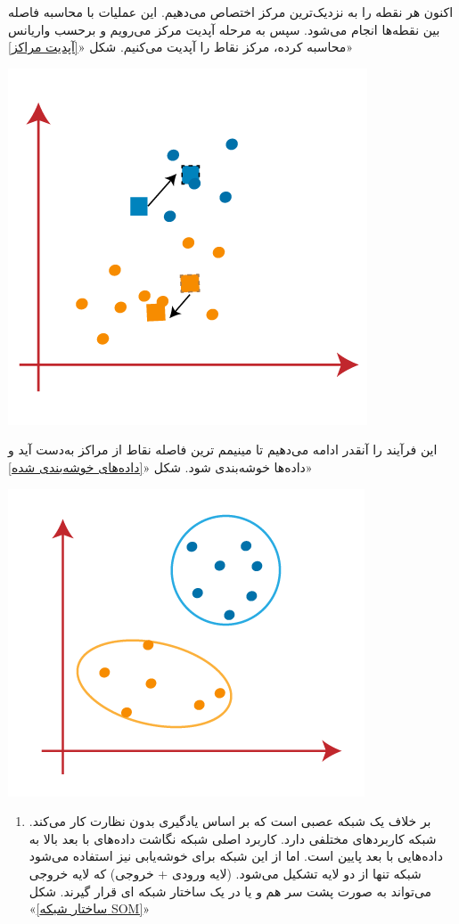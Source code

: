 \begin{enumerate}
\begin{qsolve}
	
	اکنون هر نقطه را به نزدیک‌ترین مرکز اختصاص می‌دهیم. این عملیات با محاسبه فاصله بین نقطه‌ها انجام می‌شود. سپس به مرحله آپدیت مرکز می‌رویم و برحسب واریانس محاسبه کرده، مرکز نقاط را آپدیت می‌کنیم. شکل «\ref{آپدیت مراکز}»
	
	
	 \begin{center}
	 	\includegraphics*[width=0.5\linewidth]{pics/img5.png}
	 	\label{آپدیت مراکز}
	 \end{center}

	این فرآیند را آنقدر ادامه می‌دهیم تا مینیمم ترین فاصله نقاط از مراکز به‌دست آید و داده‌ها خوشه‌بندی شود. شکل «\ref{داده‌های خوشه‌بندی شده}»

\end{qsolve}
	
	
	
	
	
\begin{qsolve}
	\begin{center}
		\includegraphics*[width=0.5\linewidth]{pics/img6.png}
		\label{داده‌های خوشه‌بندی شده}
	\end{center}
	
	
	
	\begin{enumerate}
		\item \textbf{}
		 بر خلاف  یک شبکه عصبی است که بر اساس یادگیری بدون نظارت کار می‌کند. شبکه  کاربرد‌های مختلفی دارد. کاربرد اصلی شبکه  نگاشت داده‌های با بعد بالا به داده‌هایی با بعد پایین است. اما از این شبکه برای خوشه‌یابی نیز استفاده می‌شود
		شبکه  تنها از دو لایه تشکیل می‌شود. (لایه ورودی + خروجی) که لایه خروجی می‌تواند به صورت پشت سر هم و یا در یک ساختار شبکه ای قرار گیرند. شکل «\ref{ساختار شبکه SOM}»
		

\end{enumerate}
\end{qsolve}
\end{enumerate}
